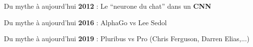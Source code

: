 \begin{frame}{Du mythe à aujourd'hui}
  \textbf{2012} : Le ``neurone du chat'' dans un \textbf{CNN}
\end{frame}

\begin{frame}{Du mythe à aujourd'hui}
  \textbf{2016} : AlphaGo vs Lee Sedol
\end{frame}

\begin{frame}{Du mythe à aujourd'hui}
  \textbf{2019} : Pluribus vs Pro (Chris Ferguson, Darren Elias,...)
\end{frame}

